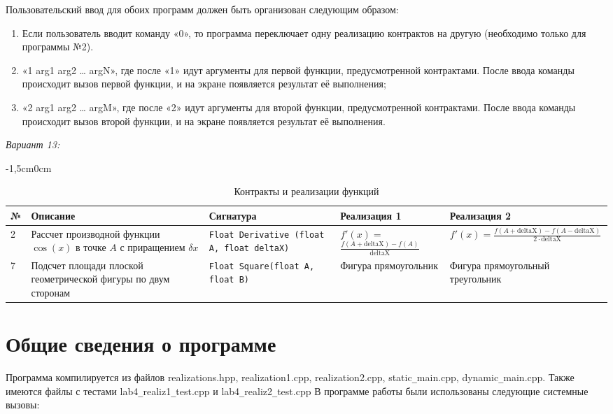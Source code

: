 \documentclass[a4paper, 14pt]{article}
\begin{document}
Пользовательский ввод для обоих программ должен быть организован следующим образом:
\begin{enumerate}
    \item Если пользователь вводит команду «0», то программа переключает одну реализацию контрактов на другую (необходимо только для программы №2).
    \item «1 arg1 arg2 … argN», где после «1» идут аргументы для первой функции, предусмотренной контрактами. После ввода команды происходит вызов первой функции, и на экране появляется результат её выполнения;
    \item «2 arg1 arg2 … argM», где после «2» идут аргументы для второй функции, предусмотренной контрактами. После ввода команды происходит вызов второй функции, и на экране появляется результат её выполнения.
\end{enumerate}
\newpage
\textit{Вариант 13:}
\begin{table}[h]
\caption{Контракты и реализации функций}
\medskip
\begin{adjustwidth}{-1,5cm}{0cm}
\medskip
\begin{tabular}{ |>{\raggedright}p{0.1cm}|>{\raggedright}p{3cm}|>{\raggedright}p{}|>{\raggedright}p{4cm}|>{\raggedright\arraybackslash}p{5cm}|  }
\hline
№ & Описание & Сигнатура & Реализация 1 & Реализация 2 \\
\hline
2 & Рассчет производной функции $\cos(x)$ в точке $A$ с приращением $\delta x$ & \texttt{Float Derivative (float A, float deltaX)} & $f'(x) =$ $ \frac{f(A+\text{deltaX}) - f(A)}{\text{deltaX}}$ & $f'(x) = \frac{f(A+\text{deltaX}) - f(A-\text{deltaX})}{2\cdot\text{deltaX}}$ \\
\hline
7 & Подсчет площади плоской геометрической фигуры по двум сторонам & \texttt{Float Square(float A, float B)} & Фигура прямоугольник & Фигура прямоугольный треугольник \\
\hline
\end{tabular}
\end{adjustwidth}
\end{table}

\section*{Общие сведения о программе}
Программа компилируется из файлов realizations.hpp, realization1.cpp, realization2.cpp,
static\texttt{\_}main.cpp, dynamic\texttt{\_}main.cpp. Также имеются файлы с тестами lab4\texttt{\_}realiz1\texttt{\_}test.cpp и lab4\texttt{\_}realiz2\texttt{\_}test.cpp  В программе работы были использованы следующие системные вызовы:
\end{document}
